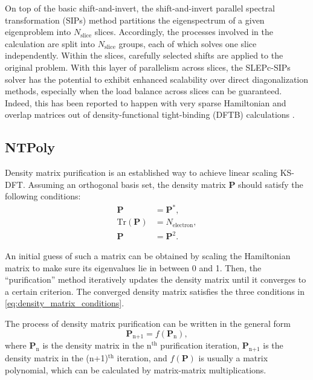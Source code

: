 \documentclass{report}
\begin{document}
On top of the basic shift-and-invert, the shift-and-invert parallel spectral transformation (SIPs) method \cite{sips_keceli_2016} partitions the eigenspectrum of a given eigenproblem into $N_\text{slice}$ slices. Accordingly, the processes involved in the calculation are split into $N_\text{slice}$ groups, each of which solves one slice independently. Within the slices, carefully selected shifts are applied to the original problem. With this layer of parallelism across slices, the SLEPc-SIPs solver has the potential to exhibit enhanced scalability over direct diagonalization methods, especially when the load balance across slices can be guaranteed. Indeed, this has been reported to happen with very sparse Hamiltonian and overlap matrices out of density-functional tight-binding (DFTB) calculations \cite{sips_keceli_2016}.

\subsection{NTPoly}
\label{subsec:solvers_ntpoly}
Density matrix purification is an established way to achieve linear scaling KS-DFT. Assuming an orthogonal basis set, the density matrix $\boldsymbol{P}$ should satisfy the following conditions:
\begin{equation}
\label{eq:density_matrix_conditions}
\begin{split}
\boldsymbol{P} & = \boldsymbol{P}^* ,\\
\text{Tr}(\boldsymbol{P}) & = N_\text{electron} ,\\
\boldsymbol{P} & = \boldsymbol{P}^2 .
\end{split}
\end{equation}

An initial guess of such a matrix can be obtained by scaling the Hamiltonian matrix to make sure its eigenvalues lie in between 0 and 1. Then, the ``purification'' method iteratively updates the density matrix until it converges to a certain criterion. The converged density matrix satisfies the three conditions in \ref{eq:density_matrix_conditions}.

The process of density matrix purification can be written in the general form
\begin{equation}
\label{eq:purification}
\boldsymbol{P}_\text{n+1} = f(\boldsymbol{P}_\text{n}) ,
\end{equation}
where $\boldsymbol{P}_\text{n}$ is the density matrix in the n$^\text{th}$ purification iteration, $\boldsymbol{P}_\text{n+1}$ is the density matrix in the (n+1)$^\text{th}$ iteration, and $f(\boldsymbol{P})$ is usually a matrix polynomial, which can be calculated by matrix-matrix multiplications.
\end{document}
